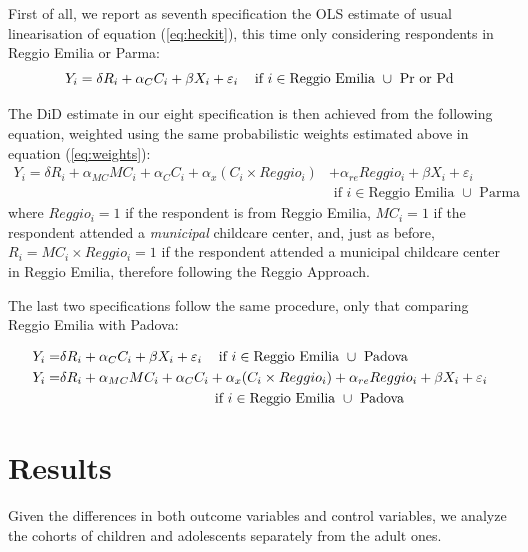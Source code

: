 \documentclass[12pt]{article}
\begin{document}
First of all, we report as seventh specification the OLS estimate of usual linearisation of equation (\ref{eq:heckit}), this time only considering respondents in Reggio Emilia or Parma:
\begin{equation}
Y_{i} = \delta R_{i} + \alpha_{C} C_{i} + \beta X_{i} + \varepsilon_{i}    \hspace{2ex} \text{ if } i \in \text{Reggio Emilia } \cup \text{ Pr or Pd} \label{eq7:OLSrepr}
\end{equation}

\medskip

The DiD estimate in our eight specification is then achieved from the following equation, weighted using the same probabilistic weights estimated above in equation (\ref{eq:weights}):
\begin{align}
Y_{i} = \delta R_{i} + \alpha_{MC} MC_{i} + \alpha_{C} C_{i} + \alpha_{x} (C_{i} \times Reggio_{i}) &+  \alpha_{re} Reggio_{i} + \beta X_{i} + \varepsilon_{i} \nonumber \\
   & \text{ if } i \in \text{Reggio Emilia } \cup \text{ Parma} \label{eq8:didpr}
\end{align} 
%
where $Reggio_{i}=1$ if the respondent is from Reggio Emilia, $MC_{i}=1$ if the respondent attended a \textit{municipal} childcare center, and, just as before, $R_{i}=MC_{i} \times Reggio_{i}=1$ if the respondent attended a municipal childcare center in Reggio Emilia, therefore following the Reggio Approach.

\medskip

The last two specifications follow the same procedure, only that comparing Reggio Emilia with Padova:

\begin{align}
Y_{i} =& \delta R_{i} + \alpha_{C} C_{i} + \beta X_{i} + \varepsilon_{i}    \hspace{2ex} \text{ if } i \in \text{Reggio Emilia } \cup \text{ Padova} \label{eq9:OLSrepd} \\
Y_{i} =& \delta R_{i} + \alpha_{MC} MC_{i} + \alpha_{C} C_{i} + \alpha_{x} (C_{i} \times Reggio_{i}) +  \alpha_{re} Reggio_{i} + \beta X_{i} + \varepsilon_{i} \nonumber \\
& \hspace{25ex} \text{ if } i \in \text{Reggio Emilia } \cup \text{ Padova} \label{eq10:didpd}
\end{align}


\section{Results}
Given the differences in both outcome variables and control variables, we analyze the cohorts of children and adolescents separately from the adult ones.
\end{document}
